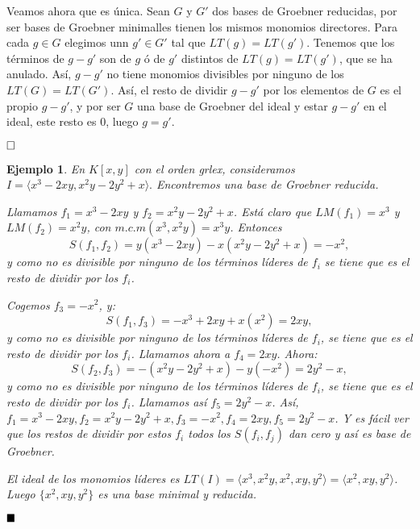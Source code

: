 \documentclass[12pt]{article}
\newtheorem{example}{Ejemplo}[theorem]
\begin{document}
Veamos ahora que es única. Sean $G$ y $G'$ dos bases de Groebner reducidas, por ser bases de Groebner minimalles tienen  los mismos monomios directores. Para cada $g \in G$ elegimos unn $g' \in G'$ tal que $LT(g) = LT(g')$. Tenemos que los términos de $g-g'$ son de $g$ ó de $g'$ distintos de $LT(g) = LT(g')$, que se ha anulado. Así, $g-g'$ no tiene monomios divisibles por ninguno de los $LT(G) = LT(G')$. Así, el resto de dividir $g-g'$ por los elementos de $G$ es el propio $g-g'$, y por ser $G$ una base de Groebner del ideal y estar $g-g'$ en el ideal, este resto es $0$, luego $g=g'$.

$\hfill \square$

\begin{example}En $K[x,y]$ con el orden grlex, consideramos $I = \langle x^3-2xy, x^2y-2y^2+x \rangle.$ Encontremos una base de Groebner reducida.

Llamamos $f_1 = x^3-2xy$ y $f_2 = x^2y-2y^2+x$. Está claro que $LM(f_1) = x^3$ y $LM(f_2)=x^2y$, con $m.c.m(x^3, x^2y) = x^3y$. Entonces $$S(f_1, f_2) = y(x^3-2xy) -x(x^2y-2y^2+x) = -x^2,$$ y como no es divisible por ninguno de los términos líderes de $f_i$ se tiene que es el resto de dividir por los $f_i$. 

Cogemos $f_3=-x^2$, y: $$S(f_1, f_3) = -x^3+2xy +x(x^2) = 2xy,$$ y como no es divisible por ninguno de los términos líderes de $f_i$, se tiene que es el resto de dividir por los $f_i$. Llamamos ahora a $f_4 = 2xy$. Ahora:$$S(f_2, f_3)=-(x^2y-2y^2+x)-y(-x^2)=2y^2-x,$$ y como no es divisible por ninguno de los términos líderes de $f_i$, se tiene que es el resto de dividir por los $f_i$. Llamamos así $f_5 = 2y^2-x$. Así, $f_1 = x^3-2xy, f_2 = x^2y-2y^2+x, f_3 = -x^2,f_4=2xy, f_5=2y^2-x$. Y es fácil ver que los restos de dividir por estos $f_i$ todos los $S(f_i,f_j)$ dan cero y así es base de Groebner.

El ideal de los monomios líderes es $LT(I) = \langle x^3,x^2y, x^2, xy, y^2 \rangle = \langle x^2, xy, y^2 \rangle$. Luego $\lbrace x^2, xy, y^2 \rbrace$ es una base minimal y reducida. 
\end{example}

$\hfill \blacksquare$
\end{document}

